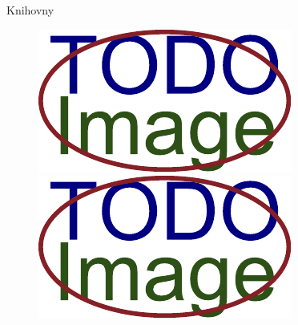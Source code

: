 \documentclass[presentation]{beamer}
\begin{document}
\begin{frame}{Knihovny}
  \begin{figure}
    \centering
    \begin{minipage}{.5\textwidth}
      \centering
      \includegraphics[width=.9\linewidth]{../doc-final-thesis/obrazky-figures/placeholder.pdf}
    \end{minipage}%
    \begin{minipage}{.5\textwidth}
      \centering
      \includegraphics[width=.9\linewidth]{../doc-final-thesis/obrazky-figures/placeholder.pdf}
    \end{minipage}
  \end{figure}


\end{frame}
\end{document}
